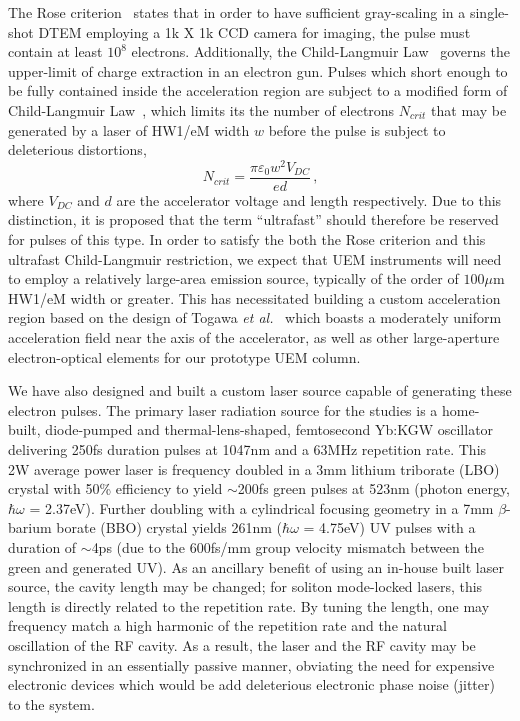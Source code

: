 The Rose criterion~\cite{rose_television_1948} states that in order to have sufficient gray-scaling in a single-shot DTEM employing a 1k X 1k CCD camera for imaging, the pulse must contain at least $10^8$ electrons.
Additionally, the Child-Langmuir Law~\cite{child_discharge_1911,langmuir_effect_1923} governs the upper-limit of charge extraction in an electron gun. 
Pulses which short enough to be fully contained inside the acceleration region are subject to a modified form of Child-Langmuir Law~\cite{valfells_effects_2002}, which limits its the number of electrons $N_{crit}$ that may be generated by a laser of HW1/eM width $w$ before the pulse is subject to deleterious distortions,
\begin{equation}
  N_{crit} = \frac{\pi \varepsilon_0 w^2 V_{DC}}{e d} \,\text{,}
\end{equation}
where $V_{DC}$ and $d$ are the accelerator voltage and length respectively.
Due to this distinction, it is proposed that the term ``ultrafast'' should therefore be reserved for pulses of this type.
In order to satisfy the both the Rose criterion and this ultrafast Child-Langmuir restriction, we expect that UEM instruments will need to employ a relatively large-area emission source, typically of the order of $100\mu\text{m}$ HW1/eM width or greater.
This has necessitated building a custom acceleration region based on the design of Togawa \textit{et al.}~\cite{togawa_ceb6_2007} which boasts a moderately uniform acceleration field near the axis of the accelerator, as well as other large-aperture electron-optical elements for our prototype UEM column.

We have also designed and built a custom laser source capable of generating these electron pulses.
The primary laser radiation source for the studies is a home-built, diode-pumped and thermal-lens-shaped, femtosecond Yb:KGW oscillator~\cite{berger_high-power_2008} delivering 250fs duration pulses at 1047nm and a 63MHz repetition rate.
This 2W average power laser is frequency doubled in a 3mm lithium triborate (LBO) crystal with 50\% efficiency to yield $\sim$200fs green pulses at 523nm (photon energy, $\hbar \omega$ = 2.37eV).
Further doubling with a cylindrical focusing geometry in a 7mm $\beta$-barium borate (BBO) crystal yields 261nm ($\hbar \omega$ = 4.75eV) UV pulses with a duration of $\sim$4ps (due to the 600fs/mm group velocity mismatch between the green and generated UV).
As an ancillary benefit of using an in-house built laser source, the cavity length may be changed; for soliton mode-locked lasers, this length is directly related to the repetition rate.
By tuning the length, one may frequency match a high harmonic of the repetition rate and the natural oscillation of the RF cavity.
As a result, the laser and the RF cavity may be synchronized in an essentially passive manner, obviating the need for expensive electronic devices which would be add deleterious electronic phase noise (jitter) to the system.

